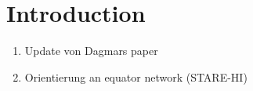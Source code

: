 \section*{Introduction}
\begin{enumerate}
    \item Update von Dagmars paper
    \item Orientierung an equator network (STARE-HI)
\end{enumerate}